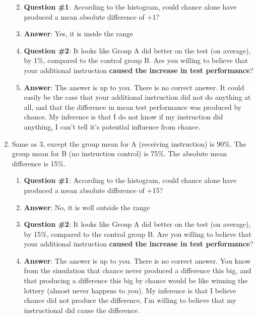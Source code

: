 \documentclass[
]{book}
\providecommand{\tightlist}{%
  \setlength{\itemsep}{0pt}\setlength{\parskip}{0pt}}
\begin{document}
\begin{enumerate}
  \begin{enumerate}
  \def\labelenumii{\alph{enumii}.}
  \tightlist
  \item
    \textbf{Question \#1}: According to the histogram, could chance alone have produced a mean absolute difference of +1?
  \item
    \textbf{Answer}: Yes, it is inside the range
  \item
    \textbf{Question \#2}: It looks like Group A did better on the test (on average), by 1\%, compared to the control group B. Are you willing to believe that your additional instruction \textbf{caused the increase in test performance}?
  \item
    \textbf{Answer}: The answer is up to you. There is no correct answer. It could easily be the case that your additional instruction did not do anything at all, and that the difference in mean test performance was produced by chance. My inference is that I do not know if my instruction did anything, I can't tell it's potential influence from chance.
  \end{enumerate}
\item
  Same as 3, except the group mean for A (receiving instruction) is 90\%. The group mean for B (no instruction control) is 75\%. The absolute mean difference is 15\%.

  \begin{enumerate}
  \def\labelenumii{\alph{enumii}.}
  \tightlist
  \item
    \textbf{Question \#1}: According to the histogram, could chance alone have produced a mean absolute difference of +15?
  \item
    \textbf{Answer}: No, it is well outside the range
  \item
    \textbf{Question \#2}: It looks like Group A did better on the test (on average), by 15\%, compared to the control group B. Are you willing to believe that your additional instruction \textbf{caused the increase in test performance}?
  \item
    \textbf{Answer}: The answer is up to you. There is no correct answer. You know from the simulation that chance never produced a difference this big, and that producing a difference this big by chance would be like winning the lottery (almost never happens to you). My inference is that I believe chance did not produce the difference, I'm willing to believe that my instructional did cause the difference.
  \end{enumerate}
\end{enumerate}
\end{document}

